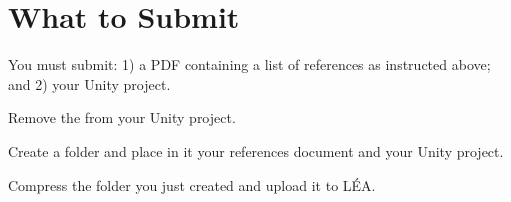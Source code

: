 \documentclass[11pt, a4paper]{article}
\begin{document}
    
\section{What to Submit}
\label{sec:submit}
\noindent You must submit: 1) a PDF containing a list of references as instructed above; and 2) your Unity project. 
\begin{borderedsquare}		
    \item Remove the \textit{\color{violet}{Library, Temp and Builds folders}} from your Unity project.
    \item Create a folder and place in it your references document and your Unity project. 
    \item Compress the folder you just created and upload it to LÉA.
\end{borderedsquare}
    
\end{document}
